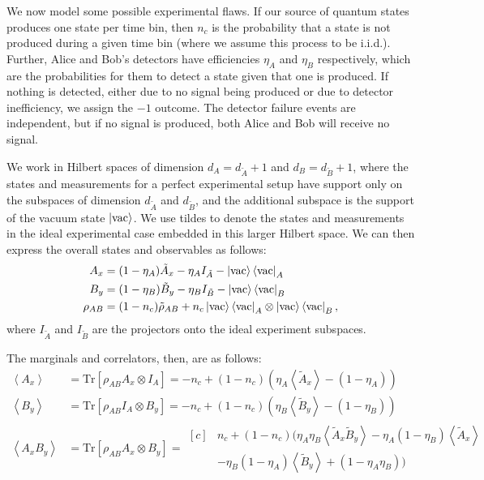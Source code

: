 \documentclass[10pt, a4paper]{article}
\numberwithin{equation}{section} %
\theoremstyle{definition}
\theoremstyle{plain}
\newcommand{\?}{\mathrel{?}} %
\newcommand{\angleb}[1]{\left\langle #1 \right\rangle} %
\newcommand{\Tr}{\mathrm{Tr}} %
\begin{document}
    We now model some possible experimental flaws. If our source of quantum states produces one state per time bin, then \(n_c\) is the probability that a state is not produced during a given time bin (where we assume this process to be i.i.d.). Further, Alice and Bob's detectors have efficiencies \(\eta_A\) and \(\eta_B\) respectively, which are the probabilities for them to detect a state given that one is produced. If nothing is detected, either due to no signal being produced or due to detector inefficiency, we assign the \(-1\) outcome. The detector failure events are independent, but if no signal is produced, both Alice and Bob will receive no signal.

    We work in Hilbert spaces of dimension \(d_{A} = d_{\tilde{A}} + 1\) and \(d_{B} = d_{\tilde{B}} + 1\), where the states and measurements for a perfect experimental setup have support only on the subspaces of dimension \(d_{\tilde{A}}\) and \(d_{\tilde{B}}\), and the additional subspace is the support of the vacuum state \(\ket{\rm vac}\). We use tildes to denote the states and measurements in the ideal experimental case embedded in this larger Hilbert space. We can then express the overall states and observables as follows:
    \begin{align*}
      A_x &= (1-\eta_A)\tilde{A}_x - \eta_A I_{\tilde{A}} - \ket{\rm vac}\bra{\rm vac}_{A} \\
      B_y &= (1-\eta_B)\tilde{B}_y - \eta_B I_{\tilde{B}} - \ket{\rm vac}\bra{\rm vac}_{B} \\
      \rho_{AB} &= (1-n_c)\tilde{\rho}_{AB} + n_c \ket{\rm vac}\bra{\rm vac}_{A} \otimes \ket{\rm vac}\bra{\rm vac}_{B},
    \end{align*}
    where \(I_{\tilde{A}}\) and \(I_{\tilde{B}}\) are the projectors onto the ideal experiment subspaces.

    The marginals and correlators, then, are as follows:
    \begin{align*}
      \angleb{A_x} &= \Tr[\rho_{AB} A_x \otimes I_A] = -n_c + (1-n_c)(\eta_A\angleb{\tilde{A}_x} - (1-\eta_A)) \\
      \angleb{B_y} &= \Tr[\rho_{AB} I_A \otimes B_y] = -n_c + (1-n_c)(\eta_B\angleb{\tilde{B}_y} - (1-\eta_B)) \\
      \angleb{A_x B_y} &= \Tr[\rho_{AB} A_x \otimes B_y] = \begin{aligned}[c]
      & n_c + (1-n_c)(\eta_A\eta_B\angleb{\tilde{A}_x\tilde{B}_y} - \eta_A(1-\eta_B)\angleb{\tilde{A}_x} \\
      & -\eta_B(1-\eta_A)\angleb{\tilde{B}_y} + (1-\eta_A\eta_B) )
      \end{aligned}
      \end{align*}
\end{document}
